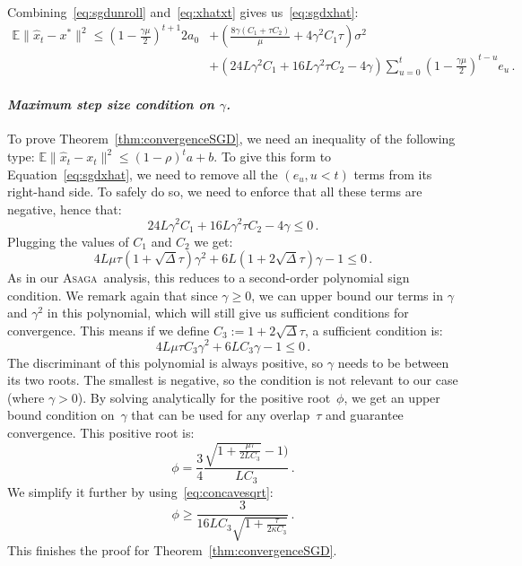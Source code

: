 \documentclass[twoside, 11pt]{article}
\newcommand{\stepsize}{\gamma}
\newcommand{\strongconvex}{\mu}
\newcommand{\overlap}{\tau}
\newcommand{\contraction}{\rho}
\newcommand{\sparsity}{\Delta}
\newcommand{\lipschitz}{L}
\newcommand{\E}{\mathbb{E}}
\newcommand{\ASAGA}{\textsc{Asaga}}
\begin{document}
Combining~\eqref{eq:sgdunroll} and~\eqref{eq:xhatxt} gives us~\eqref{eq:sgdxhat}:
\begin{align}
\E \|\hat x_t - x^*\|^2 \leq
(1 - \frac{\stepsize \strongconvex}{2})^{t+1} 2 a_{0}
&+ (\frac{8 \stepsize (C_1 + \overlap C_2)}{\strongconvex} + 4 \stepsize^2 C_1 \overlap) \sigma^2
\nonumber \\
&+ (24\lipschitz \stepsize^2 C_1 + 16\lipschitz \stepsize^2 \overlap C_2 -4\stepsize) \sum_{u=0}^{t} (1 - \frac{\stepsize \strongconvex}{2})^{t -u} e_u\,. \nonumber
\end{align}


\paragraph{\textit{Maximum step size condition on $\stepsize$.}}
To prove Theorem~\ref{thm:convergenceSGD}, we need an inequality of the following type: $\E \|\hat x_t - x_t\|^2 \leq (1-\contraction)^t a + b$.
To give this form to Equation~\eqref{eq:sgdxhat}, we need to remove all the $(e_u, u < t)$ terms from its right-hand side.
To safely do so, we need to enforce that all these terms are negative, hence that:
\begin{equation}
24\lipschitz \stepsize^2 C_1 + 16\lipschitz \stepsize^2 \overlap C_2 -4\stepsize \leq 0 \,.
\end{equation}
Plugging the values of $C_1$ and $C_2$ we get:
\begin{equation}
4\lipschitz \strongconvex \overlap (1 + \sqrt{\sparsity} \overlap) \stepsize^2
+ 6\lipschitz (1 + 2\sqrt{\sparsity} \overlap) \stepsize
-1 \leq 0 \,.
\end{equation}
As in our \ASAGA\ analysis, this reduces to a second-order polynomial sign condition.
We remark again that since $\stepsize \geq 0$, we can upper bound our terms in $\stepsize$ and $\stepsize^2$ in this polynomial, which will still give us sufficient conditions for convergence.
This means if we define $C_3:=1+2\sqrt{\sparsity} \overlap$, a sufficient condition is:
\begin{equation}
4\lipschitz \strongconvex \overlap C_3 \stepsize^2
+ 6\lipschitz C_3 \stepsize
-1 \leq 0\,.
\end{equation}
The discriminant of this polynomial is always positive, so $\stepsize$ needs to be between its two roots.
The smallest is negative, so the condition is not relevant to our case (where $\stepsize > 0$).
By solving analytically for the positive root~$\phi$, we get an upper bound condition on~$\stepsize$ that can be used for any overlap~$\overlap$ and guarantee convergence.
This positive root is:
\begin{equation}
\phi = \frac{3}{4} \frac{\sqrt{1 + \frac{\strongconvex \overlap}{2 \lipschitz C_3}} - 1)}{\lipschitz C_3}\,.
\end{equation}
We simplify it further by using~\eqref{eq:concavesqrt}:
\begin{equation}
\phi \geq \frac{3}{16 \lipschitz C_3 \sqrt{1 + \frac{\overlap}{2\kappa C_3}}}\,.
\end{equation}
This finishes the proof for Theorem~\ref{thm:convergenceSGD}.\hfill\BlackBox
\end{document}
